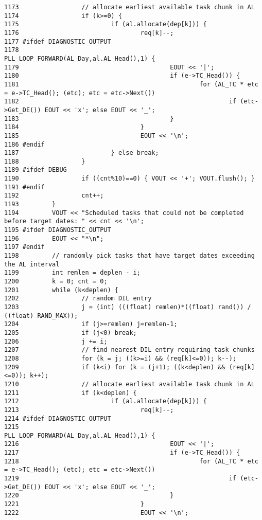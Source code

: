 \begin{verbatim}
1173                 // allocate earliest available task chunk in AL
1174                 if (k>=0) {
1175                         if (al.allocate(dep[k])) {
1176                                 req[k]--;
1177 #ifdef DIAGNOSTIC_OUTPUT
1178                                 PLL_LOOP_FORWARD(AL_Day,al.AL_Head(),1) {
1179                                         EOUT << '|';
1180                                         if (e->TC_Head()) { 
1181                                                 for (AL_TC * etc = e->TC_Head(); (etc); etc = etc->Next())
1182                                                         if (etc->Get_DE()) EOUT << 'x'; else EOUT << '_';
1183                                         }
1184                                 }
1185                                 EOUT << '\n';
1186 #endif
1187                         } else break;
1188                 }
1189 #ifdef DEBUG
1190                 if ((cnt%10)==0) { VOUT << '+'; VOUT.flush(); }
1191 #endif
1192                 cnt++;
1193         }
1194         VOUT << "Scheduled tasks that could not be completed before target dates: " << cnt << '\n';
1195 #ifdef DIAGNOSTIC_OUTPUT
1196         EOUT << "*\n";
1197 #endif
1198         // randomly pick tasks that have target dates exceeding the AL interval
1199         int remlen = deplen - i;
1200         k = 0; cnt = 0;
1201         while (k<deplen) {
1202                 // random DIL entry
1203                 j = (int) (((float) remlen)*((float) rand()) / ((float) RAND_MAX));
1204                 if (j>=remlen) j=remlen-1;
1205                 if (j<0) break;
1206                 j += i;
1207                 // find nearest DIL entry requiring task chunks
1208                 for (k = j; ((k>=i) && (req[k]<=0)); k--);
1209                 if (k<i) for (k = (j+1); ((k<deplen) && (req[k]<=0)); k++);
1210                 // allocate earliest available task chunk in AL
1211                 if (k<deplen) {
1212                         if (al.allocate(dep[k])) {
1213                                 req[k]--;
1214 #ifdef DIAGNOSTIC_OUTPUT
1215                                 PLL_LOOP_FORWARD(AL_Day,al.AL_Head(),1) {
1216                                         EOUT << '|';
1217                                         if (e->TC_Head()) { 
1218                                                 for (AL_TC * etc = e->TC_Head(); (etc); etc = etc->Next())
1219                                                         if (etc->Get_DE()) EOUT << 'x'; else EOUT << '_';
1220                                         }
1221                                 }
1222                                 EOUT << '\n';

\end{verbatim}
